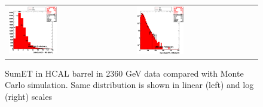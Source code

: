 \begin{figure}[h!]
 \centering
 \begin{tabular}{ll}
  \includegraphics[width=0.40\textwidth]{plots_DataVsMC_MB_2360GeV/h_caloSumetHB_lin.eps} &
  \includegraphics[width=0.40\textwidth]{plots_DataVsMC_MB_2360GeV/h_caloSumetHB.eps} \\
 \end{tabular}
 \caption{SumET in HCAL barrel in 2360 GeV data compared
   with Monte Carlo simulation. Same distribution is shown in linear (left) and log (right) scales
          \label{fig:DataVsMC_MB_2360_7}}
\end{figure}

